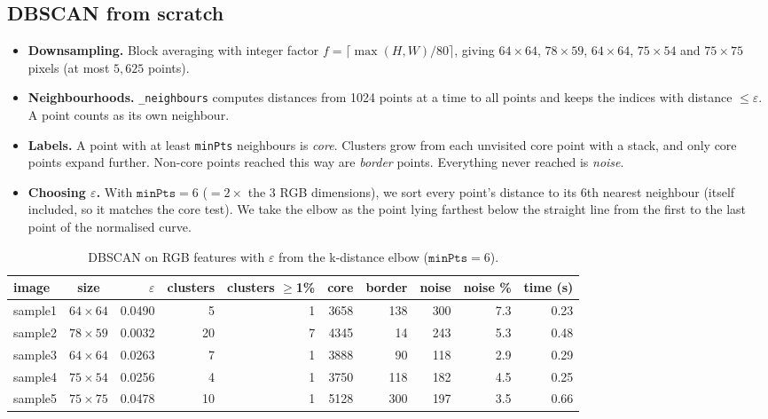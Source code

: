 \documentclass[10.5pt]{article}
\begin{document}
\subsection{DBSCAN from scratch}

\begin{itemize}
  \item \textbf{Downsampling.} Block averaging with integer factor $f=\lceil\max(H,W)/80\rceil$, giving
        $64\times64$, $78\times59$, $64\times64$, $75\times54$ and $75\times75$ pixels (at most $5{,}625$ points).
  \item \textbf{Neighbourhoods.} \texttt{\_neighbours} computes distances from 1024 points at a time to all points
        and keeps the indices with distance $\le\varepsilon$. A point counts as its own neighbour.
  \item \textbf{Labels.} A point with at least \texttt{minPts} neighbours is \emph{core}.
        Clusters grow from each unvisited core point with a stack, and only core points expand further.
        Non-core points reached this way are \emph{border} points. Everything never reached is \emph{noise}.
  \item \textbf{Choosing $\varepsilon$.} With $\texttt{minPts}=6$ ($=2\times$ the 3 RGB dimensions), we sort every
        point's distance to its 6th nearest neighbour (itself included, so it matches the core test). We take the
        elbow as the point lying farthest below the straight line from the first to the last point of the
        normalised curve.
\end{itemize}

\begin{table}[H]\centering\small
\begin{tabular}{lcrrrrrrrr}
\toprule
image & size & $\varepsilon$ & clusters & clusters $\ge$1\% & core & border & noise & noise \% & time (s)\\
\midrule
sample1 & $64\times64$ & 0.0490 & 5 & 1 & 3658 & 138 & 300 & 7.3 & 0.23\\
sample2 & $78\times59$ & 0.0032 & 20 & 7 & 4345 & 14 & 243 & 5.3 & 0.48\\
sample3 & $64\times64$ & 0.0263 & 7 & 1 & 3888 & 90 & 118 & 2.9 & 0.29\\
sample4 & $75\times54$ & 0.0256 & 4 & 1 & 3750 & 118 & 182 & 4.5 & 0.25\\
sample5 & $75\times75$ & 0.0478 & 10 & 1 & 5128 & 300 & 197 & 3.5 & 0.66\\
\bottomrule
\end{tabular}
\caption{DBSCAN on RGB features with $\varepsilon$ from the k-distance elbow ($\texttt{minPts}=6$).}
\end{table}
\end{document}
